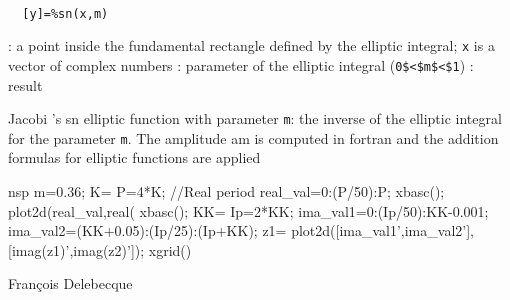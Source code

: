 
\begin{mandesc}
   \\ %
\end{mandesc}
\begin{calling_sequence}
\begin{verbatim}
  [y]=%sn(x,m)  
\end{verbatim}
\end{calling_sequence}
\begin{parameters}
  \begin{varlist}
    : a point inside the fundamental rectangle  defined by the elliptic integral; \verb!x! is a vector of complex numbers
    : parameter of the elliptic integral (\verb!0$<$m$<$1!)
    : result
  \end{varlist}
\end{parameters}
\begin{mandescription}
  Jacobi 's sn elliptic function with parameter \verb!m!: the inverse 
  of the elliptic integral for the parameter \verb!m!.
  The amplitude am is computed in fortran and 
  the addition formulas for elliptic functions are applied
\end{mandescription}
\begin{examples}
  \begin{mintednsp}{nsp}
    m=0.36;
    K=%
    P=4*K; //Real period
    real_val=0:(P/50):P;
    xbasc();
    plot2d(real_val,real(%
    xbasc();
    KK=%
    Ip=2*KK;
    ima_val1=0:(Ip/50):KK-0.001;
    ima_val2=(KK+0.05):(Ip/25):(Ip+KK);
    z1=%
    plot2d([ima_val1',ima_val2'],[imag(z1)',imag(z2)']);
    xgrid()
  \end{mintednsp}
\end{examples}
\begin{manseealso}
     
\end{manseealso}
\begin{authors}
  Fran\c{c}ois  Delebecque  
\end{authors}
